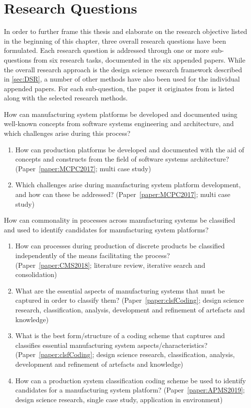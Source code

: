 \section{Research Questions}\label{sec:RQ}
In order to further frame this thesis and elaborate on the research objective listed in the beginning of this chapter, three overall research questions have been formulated.
Each research question is addressed through one or more sub-questions from six research tasks, documented in the six appended papers.
While the overall research approach is the design science research framework described in \cref{sec:DSR}, a number of other methods have also been used for the individual appended papers.
For each sub-question, the paper it originates from is listed along with the selected research methods.
\begin{resq}\label{resq1}
  How can manufacturing system platforms be developed and documented using well-known concepts from software systems engineering and architecture, and which challenges arise during this process? 
  \begin{enumerate}[leftmargin=3em, label=RQ\arabic{resq}.\arabic*]
    \item How can production platforms be developed and documented with the aid of concepts and constructs from the field of software systems architecture? (Paper~\ref{paper:MCPC2017}; multi case study)
    \item Which challenges arise during manufacturing system platform development, and how can these be addressed? (Paper~\ref{paper:MCPC2017}; multi case study)
  \end{enumerate}
\end{resq}
\begin{resq}\label{resq2}
  How can commonality in processes across manufacturing systems be classified and used to identify candidates for manufacturing system platforms?
  \begin{enumerate}[leftmargin=3em, label=RQ\arabic{resq}.\arabic*]
    \item How can processes during production of discrete products be classified independently of the means facilitating the process? (Paper~\ref{paper:CMS2018}; literature review, iterative search and consolidation)
    \item What are the essential aspects of manufacturing systems that must be captured in order to classify them? (Paper~\ref{paper:clsfCoding}; design science research, classification, analysis, development and refinement of artefacts and knowledge)
    \item What is the best form/structure of a coding scheme that captures and classifies essential manufacturing system aspects/characteristics? (Paper~\ref{paper:clsfCoding}; design science research, classification, analysis, development and refinement of artefacts and knowledge)
    \item How can a production system classification coding scheme be used to identify candidates for a manufacturing system platform? (Paper~\ref{paper:APMS2019}; design science research, single case study, application in environment)
  \end{enumerate}
\end{resq}
